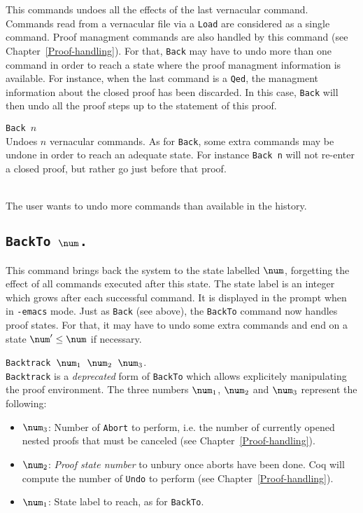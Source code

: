 This commands undoes all the effects of the last vernacular
command. Commands read from a vernacular file via a {\tt Load} are
considered as a single command. Proof managment commands
are also handled by this command (see Chapter~\ref{Proof-handling}).
For that, {\tt Back} may have to undo more than one command in order
to reach a state where the proof managment information is available.
For instance, when the last command is a {\tt Qed}, the managment
information about the closed proof has been discarded. In this case,
{\tt Back} will then undo all the proof steps up to the statement of
this proof.

\begin{Variants}
\item {\tt Back $n$} \\
  Undoes $n$ vernacular commands. As for {\tt Back}, some extra
  commands may be undone in order to reach an adequate state.
  For instance {\tt Back n} will not re-enter a closed proof,
  but rather go just before that proof.
\end{Variants}

\begin{ErrMsgs}
\item {} \\
  The user wants to undo more commands than available in the history.
\end{ErrMsgs}

\subsection[\tt BackTo $\num$.]{\tt BackTo $\num$.}
\label{sec:statenums}

This command brings back the system to the state labelled $\num$,
forgetting the effect of all commands executed after this state.
The state label is an integer which grows after each successful command.
It is displayed in the prompt when in \texttt{-emacs} mode.
Just as {\tt Back} (see above), the {\tt BackTo} command now handles
proof states. For that, it may have to undo some
extra commands and end on a state $\num' \leq \num$ if necessary.

\begin{Variants}
\item {\tt Backtrack $\num_1$ $\num_2$ $\num_3$}.\\
  {\tt Backtrack} is a \emph{deprecated} form of {\tt BackTo} which
  allows explicitely manipulating the proof environment. The three
  numbers $\num_1$, $\num_2$ and $\num_3$ represent the following:
\begin{itemize}
\item $\num_3$: Number of \texttt{Abort} to perform, i.e. the number
  of currently opened nested proofs that must be canceled (see
  Chapter~\ref{Proof-handling}).
\item $\num_2$: \emph{Proof state number} to unbury once aborts have
  been done. Coq will compute the number of \texttt{Undo} to perform
  (see Chapter~\ref{Proof-handling}).
\item $\num_1$: State label to reach, as for {\tt BackTo}.
\end{itemize}
\end{Variants}

